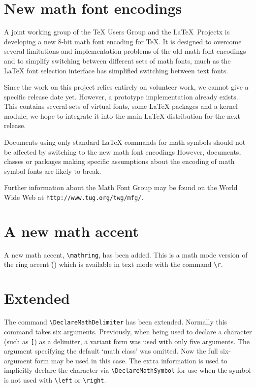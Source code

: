 \documentclass{ltnews}
\begin{document}
\maketitle


\section{New math font encodings}

A joint working group of the \TeX{} Users Group and the \LaTeX\
Projectx is developing a new 8-bit math font encoding for \TeX{}.
It is designed to overcome several limitations and implementation
problems of the old math font encodings and to simplify switching
between different sets of math fonts, much as the \LaTeX{} font
selection interface has simplified switching between text fonts.

Since the work on this project relies entirely on volunteer work, we
cannot give a specific release date yet.  However, a prototype
implementation already exists.  This contains several sets of virtual
fonts, some \LaTeX{} packages and a kernel module; we hope to
integrate it into the main \LaTeX{} distribution for the next
release.

Documents using only standard \LaTeX{} commands for math symbols
should not be affected by switching to the new math font encodings
However, documents, classes or packages making specific assumptions
about the encoding of math symbol fonts are likely to break.

Further information about the Math Font Group may be found on
the World Wide Web at \texttt{http://www.tug.org/twg/mfg/}.


\section{A new math accent}

A new math accent, \verb|\mathring|, has been added. This is a math mode
version of the ring accent (\r{}) which is available in text
mode with the command \verb|\r|.

\section{Extended }

The command \verb|\DeclareMathDelimiter| has been extended.
Normally this command takes six arguments. Previously, when being used
to declare a character (such as \texttt{[}) as a delimiter, a variant
form was used with only five arguments. The argument specifying the
default `math class' was omitted. Now the full six-argument form may be
used in this case. The extra information is used to implicitly declare
the character via \verb|\DeclareMathSymbol| for use when the symbol is
not used with \verb|\left| or \verb|\right|.
\end{document}
